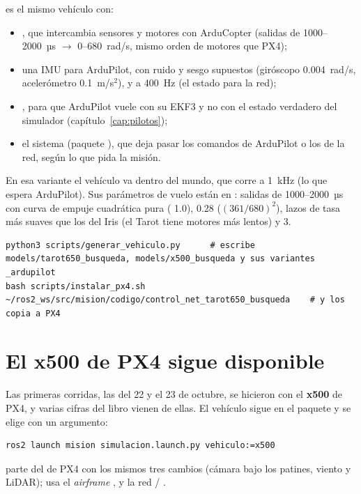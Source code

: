  es el mismo vehículo con:
\begin{itemize}
  \item {}, que intercambia sensores y motores con ArduCopter (salidas de
        1000--2000~µs $\rightarrow$ 0--680~rad/s, mismo orden de motores que PX4);
  \item una IMU para ArduPilot, con ruido y sesgo supuestos (giróscopo 0.004~rad/s, acelerómetro
        0.1~m/s$^2$), y  a 400~Hz (el estado para la red);
  \item {}, para que ArduPilot vuele con su EKF3 y no con el estado verdadero del
        simulador (capítulo~\ref{cap:pilotos});
  \item el sistema  (paquete ), que deja pasar los comandos
        de ArduPilot o los de la red, según lo que pida la misión.
\end{itemize}
En esa variante el vehículo va dentro del mundo, que corre a 1~kHz (lo que espera ArduPilot). Sus
parámetros de vuelo están en : salidas de 1000--2000~µs con curva
de empuje cuadrática pura ( 1.0),  0.28 ($(361/680)^2$), lazos
de tasa más suaves que los del Iris (el Tarot tiene motores más lentos) y  3.

\begin{lstlisting}[style=bash]
python3 scripts/generar_vehiculo.py      # escribe models/tarot650_busqueda, models/x500_busqueda y sus variantes _ardupilot
bash scripts/instalar_px4.sh ~/ros2_ws/src/mision/codigo/control_net_tarot650_busqueda    # y los copia a PX4
\end{lstlisting}

\section{El x500 de PX4 sigue disponible}

Las primeras corridas, las del 22 y el 23 de octubre, se hicieron con el \textbf{x500} de PX4, y varias
cifras del libro vienen de ellas. El vehículo sigue en el paquete y se elige con un argumento:
\begin{lstlisting}[style=bash]
ros2 launch mision simulacion.launch.py vehiculo:=x500
\end{lstlisting}
 parte del  de PX4 con los mismos tres cambios (cámara bajo los
patines, viento y LiDAR); usa el \emph{airframe} , 
y la red  / .

